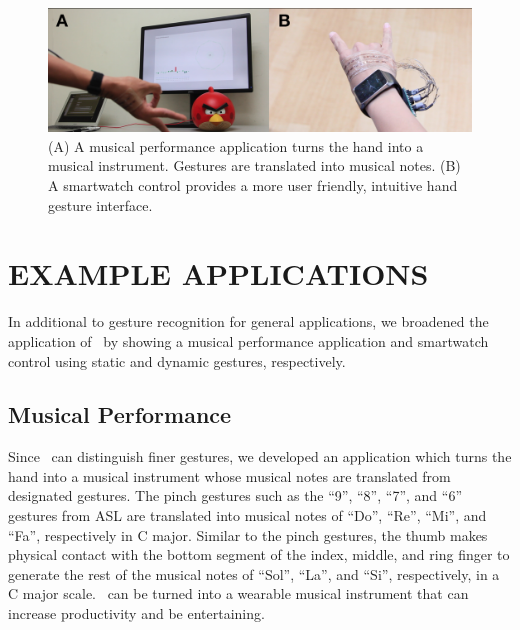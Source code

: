 \documentclass{sigchi}
\begin{document}
\begin{figure}[h]
  \begin{center}
  \includegraphics[width=1\columnwidth]{figures/apps.jpg}
  \caption{(A) A musical performance application turns the hand into a musical instrument. Gestures are translated into musical notes. (B) A smartwatch control provides a more user friendly, intuitive hand gesture interface.}
  \label{fig:APPS}
  \end{center}
\end{figure}

\section{EXAMPLE APPLICATIONS}

In additional to gesture recognition for general applications, we broadened the application of \getTitleName\ by showing a musical performance application and smartwatch control using static and dynamic gestures, respectively.

\subsection{Musical Performance}

Since \getTitleName\ can distinguish finer gestures, we developed an application which turns the hand into a musical instrument whose musical notes are translated from designated gestures. The pinch gestures such as the ``9'', ``8'', ``7'', and ``6'' gestures from ASL are translated into musical notes of ``Do'', ``Re'', ``Mi'', and ``Fa'', respectively in C major. Similar to the pinch gestures, the thumb makes physical contact with the bottom segment of the index, middle, and ring finger to generate the rest of the musical notes of ``Sol'', ``La'', and ``Si'', respectively, in a C major scale. \getTitleName\ can be turned into a wearable musical instrument that can increase productivity and be entertaining.
\end{document}
